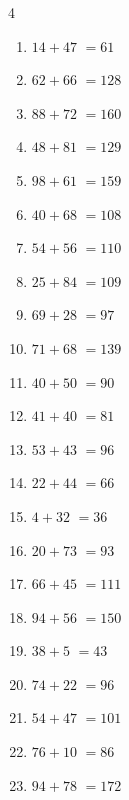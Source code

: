 \begin{multicols}{4}
\begin{enumerate}
  \item $14+47$
        $=61$

\columnbreak %

  \item $62+66$
        $=128$

  \item $88+72$
        $=160$

  \item $48+81$
        $=129$

  \item $98+61$
        $=159$

  \item $40+68$
        $=108$

  \item $54+56$
        $=110$

  \item $25+84$
        $=109$

  \item $69+28$
        $=97$

  \item $71+68$
        $=139$

  \item $40+50$
        $=90$

  \item $41+40$
        $=81$

  \item $53+43$
        $=96$

  \item $22+44$
        $=66$

  \item $4+32$
        $=36$

  \item $20+73$
        $=93$

  \item $66+45$
        $=111$

  \item $94+56$
        $=150$

  \item $38+5$
        $=43$

  \item $74+22$
        $=96$

  \item $54+47$
        $=101$

  \item $76+10$
        $=86$

  \item $94+78$
        $=172$


\end{enumerate}
\end{multicols}

